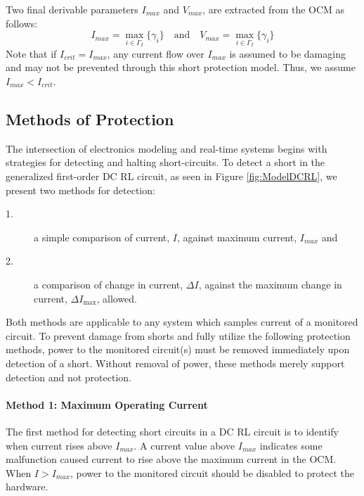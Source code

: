 Two final derivable parameters $I_{max}$ and $V_{max}$, are extracted from the OCM as follows:
\begin{equation}\label{eq:Imax}
I_{max} = \max_{i \in \Gamma_{I}} \{\gamma_i\} \quad \text{and} \quad V_{max} = \max_{i \in \Gamma_{I}} \{\gamma_i\}
\end{equation}
Note that if $I_{crit} = I_{max}$, any current flow over $I_{max}$ is assumed to be damaging and may not be prevented through this short protection model. Thus, we assume $I_{max} < I_{crit}$.
\clearpage \subsection{Methods of Protection}\label{subsec:method of protection}
The intersection of electronics modeling and real-time systems begins with strategies for detecting and halting short-circuits. To detect a short in the generalized first-order DC RL circuit, as seen in Figure \ref{fig:ModelDCRL}, we present two methods for detection:
\begin{description}
\item [1.] a simple comparison of current, $I$, against maximum current, $I_{max}$ and
\item [2.] a comparison of change in current, $\Delta I$, against the maximum change in current, $\Delta I_{\max}$, allowed.
\end{description}
Both methods are applicable to any system which samples current of a monitored circuit. To prevent damage from shorts and fully utilize the following protection methods, power to the monitored circuit(s) must be removed immediately upon detection of a short. Without removal of power, these methods merely support detection and not protection.
\paragraph{Method 1: Maximum Operating Current}
The first method for detecting short circuits in a DC RL circuit is to identify when current rises above $I_{max}$. A current value above $I_{max}$ indicates some malfunction caused current to rise above the maximum current in the OCM. When $I > I_{max}$, power to the monitored circuit should be disabled to protect the hardware.
